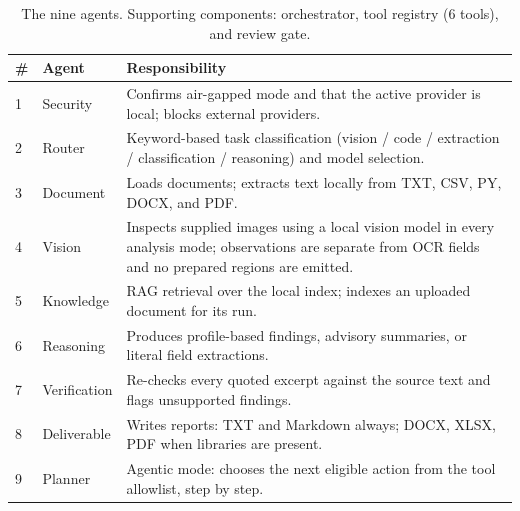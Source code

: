 \documentclass[11pt,a4paper]{article}
\begin{document}
\begin{table}[htbp]
\centering
\small
\begin{tabular}{@{}p{0.4cm} p{3.1cm} p{8.6cm}@{}}
\toprule
\textbf{\#} & \textbf{Agent} & \textbf{Responsibility} \\
\midrule
1 & Security & Confirms air-gapped mode and that the active provider is local; blocks external providers. \\
2 & Router & Keyword-based task classification (vision / code / extraction / classification / reasoning) and model selection. \\
3 & Document & Loads documents; extracts text locally from TXT, CSV, PY, DOCX, and PDF. \\
4 & Vision & Inspects supplied images using a local vision model in every analysis mode; observations are separate from OCR fields and no prepared regions are emitted. \\
5 & Knowledge & RAG retrieval over the local index; indexes an uploaded document for its run. \\
6 & Reasoning & Produces profile-based findings, advisory summaries, or literal field extractions. \\
7 & Verification & Re-checks every quoted excerpt against the source text and flags unsupported findings. \\
8 & Deliverable & Writes reports: TXT and Markdown always; DOCX, XLSX, PDF when libraries are present. \\
9 & Planner & Agentic mode: chooses the next eligible action from the tool allowlist, step by step. \\
\bottomrule
\end{tabular}
\caption{The nine agents. Supporting components: orchestrator, tool registry (6 tools), and review gate.}
\end{table}
\end{document}
